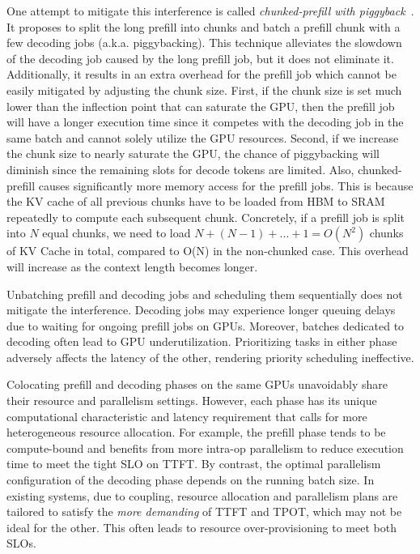 One attempt to mitigate this interference is called \textit{chunked-prefill with piggyback}~\cite{agrawal2023sarathi, deepspeed_mii}. It proposes to split the long prefill into chunks and batch a prefill chunk with a few decoding jobs (a.k.a. piggybacking). This technique alleviates the slowdown of the decoding job caused by the long prefill job, but it does not eliminate it. Additionally, it results in an extra overhead for the prefill job which cannot be easily mitigated by adjusting the chunk size. First, if the chunk size is set much lower than the inflection point that can saturate the GPU, then the prefill job will have a longer execution time since it competes with the decoding job in the same batch and cannot solely utilize the GPU resources. Second, if we increase the chunk size to nearly saturate the GPU, the chance of piggybacking will diminish since the remaining slots for decode tokens are limited. Also, chunked-prefill causes significantly more memory access for the prefill jobs. This is because the KV cache of all previous chunks have to be loaded from HBM to SRAM repeatedly to compute each subsequent chunk. Concretely, if a prefill job is split into $N$ equal chunks, we need to load $N + (N-1) + ... + 1 = O(N^2)$ chunks of KV Cache in total, compared to O(N) in the non-chunked case. This overhead will increase as the context length becomes longer.

 Unbatching prefill and decoding jobs and scheduling them sequentially does not mitigate the interference. Decoding jobs may experience longer queuing delays due to waiting for ongoing prefill jobs on GPUs. Moreover, batches dedicated to decoding often lead to GPU underutilization. Prioritizing tasks in either phase adversely affects the latency of the other, rendering priority scheduling ineffective.

 Colocating prefill and decoding phases on the same GPUs unavoidably share their resource and parallelism settings. However, each phase has its unique computational characteristic and latency requirement that calls for more heterogeneous resource allocation. 
For example, the prefill phase tends to be compute-bound and benefits from more intra-op parallelism to reduce execution time to meet the tight SLO on TTFT. By contrast, the optimal parallelism configuration of the decoding phase depends on the running batch size.
In existing systems, due to coupling, resource allocation and parallelism plans are tailored to satisfy the \emph{more demanding} of TTFT and TPOT, which may not be ideal for the other. This often leads to resource over-provisioning to meet both SLOs. 

